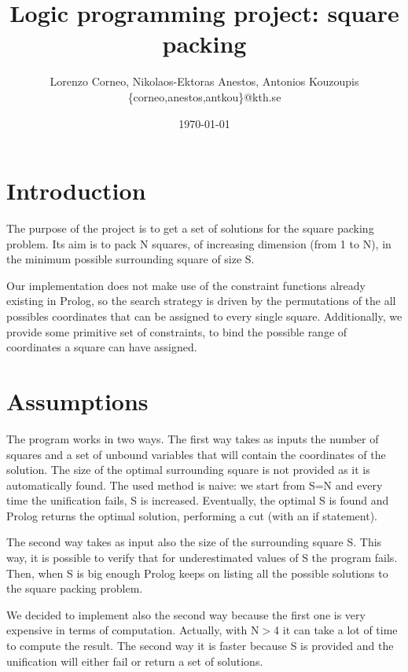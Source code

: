 \documentclass{article}
\begin{document}
\title{Logic programming project: square packing}
\author{Lorenzo Corneo, Nikolaos-Ektoras Anestos, Antonios Kouzoupis \\
	\{corneo,anestos,antkou\}@kth.se}
\date{\today}
\maketitle

\section{Introduction}

The purpose of the project is to get a set of solutions for the square packing problem. Its aim is to pack N squares, of increasing dimension (from 1 to N), in the minimum possible surrounding square of size S.

Our implementation does not make use of the constraint functions already existing in Prolog, so the search strategy is driven by the permutations of the all possibles coordinates that can be assigned to every single square. Additionally, we provide some primitive set of constraints, to bind the possible range of coordinates a square can have assigned.

\section{Assumptions}

The program works in two ways. The first way takes as inputs the number of squares and a set of unbound variables that will contain the coordinates of the solution. The size of the optimal surrounding square is not provided as it is automatically found. The used method is naive: we start from S=N and every time the unification fails, S is increased. Eventually, the  optimal S is found and Prolog returns the optimal solution, performing a cut (with an if statement).

The second way takes as input also the size of the surrounding square S. This way, it is possible to verify that for underestimated values of S the program fails. Then, when S is big enough Prolog keeps on listing all the possible solutions to the square packing problem.

We decided to implement also the second way because the first one is very expensive in terms of computation. Actually, with N$>$4 it can take a lot of time to compute the result. The second way it is faster because S is provided and the unification will either fail or return a set of solutions.
\end{document}
